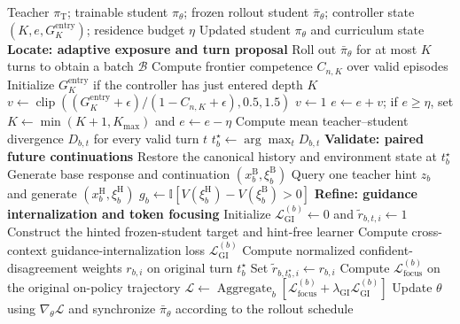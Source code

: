 \documentclass{article}
\begin{document}
\begin{algorithm}[H]
\caption{One training iteration of LENS-OPD}
\label{alg:lens-opd}
\small
\begin{algorithmic}[1]
\Require Teacher $\pi_{\mathrm T}$; trainable student $\pi_\theta$; frozen rollout student
$\bar\pi_\theta$; controller state $(K,e,G_K^{\mathrm{entry}})$; residence budget $\eta$
\Ensure Updated student $\pi_\theta$ and curriculum state
\Statex \textbf{Locate: adaptive exposure and turn proposal}
\State Roll out $\bar\pi_\theta$ for at most $K$ turns to obtain a batch $\mathcal B$
    \State Compute frontier competence $C_{n,K}$ over valid episodes
    \State Initialize $G_K^{\mathrm{entry}}$ if the controller has just entered depth $K$
    \State $v\gets\operatorname{clip}\!\left(
      (G_K^{\mathrm{entry}}+\epsilon)/(1-C_{n,K}+\epsilon),0.5,1.5\right)$
\Else
    \State $v\gets 1$ 
\EndIf
\State $e\gets e+v$; if $e\ge\eta$, set $K\gets\min(K+1,K_{\max})$ and $e\gets e-\eta$
    \State Compute mean teacher--student divergence $D_{b,t}$ for every valid turn $t$
    \State $t_b^\star\gets\arg\max_t D_{b,t}$
    \Statex \textbf{Validate: paired future continuations}
    \State Restore the canonical history and environment state at $t_b^\star$
    \State Generate base response and continuation $(x_b^{\mathrm B},\xi_b^{\mathrm B})$
    \State Query one teacher hint $z_b$ and generate $(x_b^{\mathrm H},\xi_b^{\mathrm H})$
    \State $g_b\gets\mathbb I\!\left[V(\xi_b^{\mathrm H})-V(\xi_b^{\mathrm B})>0\right]$
    \Statex \textbf{Refine: guidance internalization and token focusing}
    \State Initialize $\mathcal L_{\mathrm{GI}}^{(b)}\gets0$ and $\widetilde r_{b,t,i}\gets1$
        \State Construct the hinted frozen-student target and hint-free learner
        \State Compute cross-context guidance-internalization loss $\mathcal L_{\mathrm{GI}}^{(b)}$
        \State Compute normalized confident-disagreement weights $r_{b,i}$ on original turn $t_b^\star$
        \State Set $\widetilde r_{b,t_b^\star,i}\gets r_{b,i}$
    \EndIf
    \State Compute $\mathcal L_{\mathrm{focus}}^{(b)}$ on the original on-policy trajectory
\EndFor
\State $\mathcal L\gets
\operatorname{Aggregate}_b\!\left[
\mathcal L_{\mathrm{focus}}^{(b)}+
\lambda_{\mathrm{GI}}\mathcal L_{\mathrm{GI}}^{(b)}\right]$
\State Update $\theta$ using $\nabla_\theta\mathcal L$ and synchronize $\bar\pi_\theta$ according to the rollout schedule
\end{algorithmic}
\end{algorithm}
\end{document}
